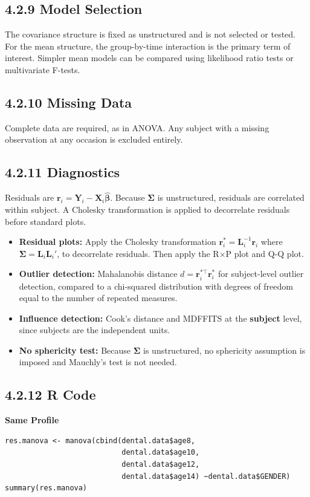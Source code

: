 \documentclass[11pt]{article}
\newcommand{\bY}{\mathbf{Y}}
\newcommand{\bX}{\mathbf{X}}
\newcommand{\bbeta}{\boldsymbol{\beta}}
\newcommand{\bSigma}{\boldsymbol{\Sigma}}
\begin{document}
\subsection*{4.2.9 Model Selection}

The covariance structure is fixed as unstructured and is not selected or tested. For the mean structure, the group-by-time interaction is the primary term of interest. Simpler mean models can be compared using likelihood ratio tests or multivariate F-tests.

\subsection*{4.2.10 Missing Data}

Complete data are required, as in ANOVA. Any subject with a missing observation at any occasion is excluded entirely.

\subsection*{4.2.11 Diagnostics}

Residuals are $\mathbf{r}_i = \bY_i - \bX_i\hat{\bbeta}$. Because $\bSigma$ is unstructured, residuals are correlated within subject. A Cholesky transformation is applied to decorrelate residuals before standard plots.

\begin{itemize}[leftmargin=2em]
  \item \textbf{Residual plots:} Apply the Cholesky transformation $\mathbf{r}_i^* = \mathbf{L}_i^{-1}\mathbf{r}_i$ where $\bSigma = \mathbf{L}_i\mathbf{L}_i'$, to decorrelate residuals. Then apply the R$\times$P plot and Q-Q plot.
  \item \textbf{Outlier detection:} Mahalanobis distance $d = \mathbf{r}_i^{*\top}\mathbf{r}_i^*$ for subject-level outlier detection, compared to a chi-squared distribution with degrees of freedom equal to the number of repeated measures.
  \item \textbf{Influence detection:} Cook's distance and MDFFITS at the \textbf{subject} level, since subjects are the independent units.
  \item \textbf{No sphericity test:} Because $\bSigma$ is unstructured, no sphericity assumption is imposed and Mauchly's test is not needed.
\end{itemize}

\subsection*{4.2.12 R Code}
\textbf{Same Profile}
\begin{lstlisting}[style=Rstyle]
res.manova <- manova(cbind(dental.data$age8,
                           dental.data$age10,
                           dental.data$age12,
                           dental.data$age14) ~dental.data$GENDER)
summary(res.manova)
\end{lstlisting}
\end{document}
